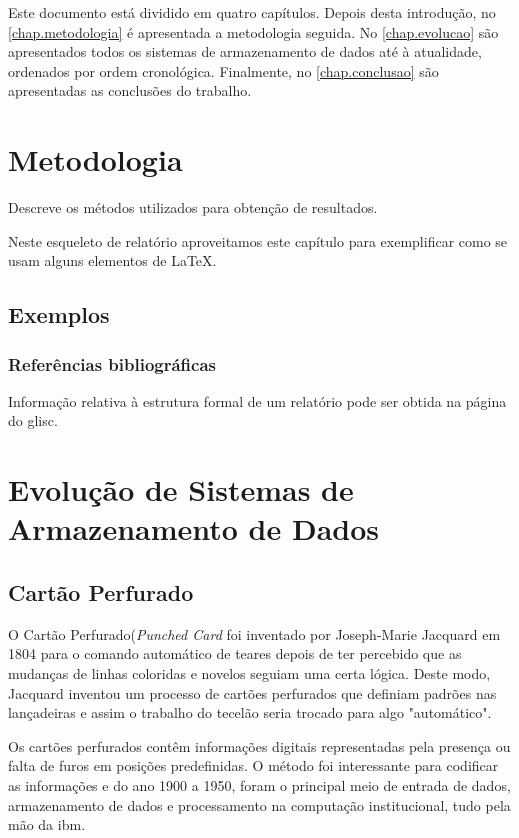 \documentclass{report}
\begin{document}
Este documento está dividido em quatro capítulos.
Depois desta introdução, no \autoref{chap.metodologia} é apresentada a metodologia seguida.
	No \autoref{chap.evolucao} são apresentados todos os sistemas de armazenamento de dados até à atualidade, ordenados por ordem cronológica. 
	Finalmente, no \autoref{chap.conclusao} são apresentadas
as conclusões do trabalho.

\chapter{Metodologia}
\label{chap.metodologia}
Descreve os métodos utilizados para obtenção de resultados.

Neste esqueleto de relatório aproveitamos este capítulo para exemplificar
como se usam alguns elementos de {\LaTeX}.

\section{Exemplos}

\subsection{Referências bibliográficas}
Informação relativa à estrutura formal de um relatório pode ser obtida
na página do \ac{glisc}\cite{glisc}.

\newpage
\chapter{Evolução de Sistemas de Armazenamento de Dados}
\label{chap.evolucao}
	\section{Cartão Perfurado}

		O Cartão Perfurado(\textit{Punched Card} foi inventado por Joseph-Marie Jacquard em 1804 para o comando automático de teares depois de ter percebido que as mudanças de linhas coloridas e novelos  seguiam uma certa lógica. Deste modo, Jacquard inventou um processo de cartões perfurados que definiam padrões nas lançadeiras e assim o trabalho do tecelão seria trocado para algo "automático". 
		
		Os cartões perfurados contêm informações digitais representadas pela presença ou falta de furos em posições predefinidas. O método foi interessante para codificar as informações e do ano 1900 a 1950, foram o principal meio de entrada de dados, armazenamento de dados e processamento na computação institucional, tudo pela mão da \ac{ibm}. 
		
\end{document}
